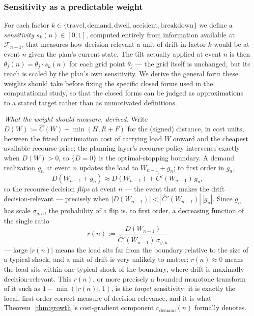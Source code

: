 \documentclass[trsc,dblanonrev]{informs4}
\newcommand{\F}{\mathcal{F}}
\begin{document}
\subsubsection{Sensitivity as a predictable weight}

For each factor $k \in \{\text{travel}, \text{demand}, \text{dwell},
\text{accident}, \text{breakdown}\}$ we define a \emph{sensitivity}
$s_k(n) \in [0,1]$, computed entirely from information available at
$\F_{n-1}$, that measures how decision-relevant a unit of drift in
factor $k$ would be at event $n$ given the plan's current state. The
tilt actually applied at event $n$ is then $\theta_j(n) = \theta_j
\cdot s_k(n)$ for each grid point $\theta_j$ --- the grid itself is
unchanged, but its reach is scaled by the plan's own sensitivity. We
derive the general form these weights should take before fixing the
specific closed forms used in the computational study, so that the
closed forms can be judged as approximations to a stated target rather
than as unmotivated definitions.

\emph{What the weight should measure, derived.} Write $D(W) :=
\widehat C(W) - \min(H, R+F)$ for the (signed) distance, in cost units,
between the fitted continuation cost of carrying load $W$ onward and
the cheapest available recourse price; the planning layer's recourse
policy intervenes exactly when $D(W) > 0$, so $\{D = 0\}$ is the
optimal-stopping boundary. A demand realization $g_n$ at event $n$
updates the load to $W_{n-1} + g_n$; to first order in $g_n$,
\begin{equation}\label{eq:dtaylor}
D(W_{n-1} + g_n) \approx D(W_{n-1}) + \widehat C'(W_{n-1})\, g_n,
\end{equation}
so the recourse decision \emph{flips} at event $n$ --- the event that
makes the drift decision-relevant --- precisely when $|D(W_{n-1})| <
|\widehat C'(W_{n-1})|\,|g_n|$. Since $g_n$ has scale $\sigma_{g,n}$,
the probability of a flip is, to first order, a decreasing function of
the single ratio
\begin{equation}\label{eq:truesens}
r(n) := \frac{D(W_{n-1})}{\widehat C'(W_{n-1})\, \sigma_{g,n}}
\end{equation}
--- large $|r(n)|$ means the load sits far from the boundary relative
to the size of a typical shock, and a unit of drift is very unlikely to
matter; $r(n) \approx 0$ means the load sits within one typical shock
of the boundary, where drift is maximally decision-relevant. This
$r(n)$, or more precisely a bounded monotone transform of it such as
$1 - \min(|r(n)|,1)$, is the \emph{target} sensitivity: it is exactly
the local, first-order-correct measure of decision relevance, and it is
what Theorem~\ref{thm:growth}'s cost-gradient component $c_{\mathrm
{demand}}(n)$ formally denotes.
\end{document}
